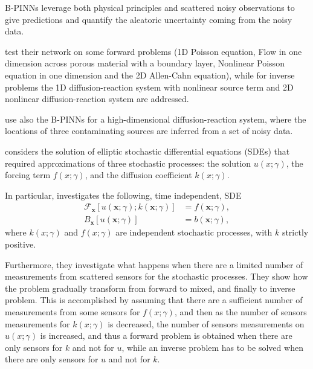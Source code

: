 \documentclass[pdflatex,sn-basic]{sn-jnl}%
\theoremstyle{thmstyleone}%
\theoremstyle{thmstyletwo}%
\theoremstyle{thmstylethree}%
\begin{document}
B-PINNs \citep{Yan2021_BPinnsBayesian_MenYMK} leverage both physical principles and scattered noisy observations to give predictions and quantify the aleatoric uncertainty coming from the noisy data.

\cite{Yan2021_BPinnsBayesian_MenYMK} test their network on some forward problems (1D Poisson equation, Flow in one dimension across porous material with a boundary layer, Nonlinear Poisson equation in one dimension and the 2D Allen-Cahn equation), while for inverse problems the 1D diffusion-reaction system with nonlinear source term and 2D nonlinear diffusion-reaction system are addressed.

\cite{Yan2021_BPinnsBayesian_MenYMK} use also the B-PINNs for a high-dimensional diffusion-reaction system, where the locations of three contaminating sources are inferred from a set of noisy data.

\cite{Yan2020_PhysicsInformedGenerative_ZhaYZK} considers the solution of elliptic stochastic differential equations (SDEs) that required approximations of three stochastic processes: the solution $u(x;\gamma)$, the forcing term $f(x;\gamma)$, and the diffusion coefficient $k(x;\gamma)$. 

In particular, \cite{Yan2020_PhysicsInformedGenerative_ZhaYZK}  investigates the following, time independent, SDE
\begin{equation*}
\begin{aligned}
\mathcal{F}_{\boldsymbol{x}}[u(\boldsymbol{x} ; \gamma) ; k(\boldsymbol{x} ; \gamma)] &=f(\boldsymbol{x} ; \gamma),%
\\
B_{\boldsymbol{x}}[u(\boldsymbol{x} ; \gamma)] &=b(\boldsymbol{x} ; \gamma), %
\end{aligned}
\end{equation*}
where $k(x; \gamma )$ and $f (x; \gamma )$ are independent stochastic processes, with $k$ strictly positive.

Furthermore, they investigate what happens when there are a limited number of measurements from scattered sensors for the stochastic processes.
They show how the problem gradually transform from forward to mixed, and finally to inverse problem. This is accomplished by assuming that there are a sufficient number of measurements from some sensors for $f(x;\gamma)$, and then as the number of sensors measurements for $k(x;\gamma)$ is decreased, the number of sensors measurements on $u(x;\gamma)$ is increased, and thus a forward problem is obtained when there are only sensors for $k$ and not for $u$, while an inverse problem has to be solved when there are only sensors for $u$ and not for $k$.
\end{document}
